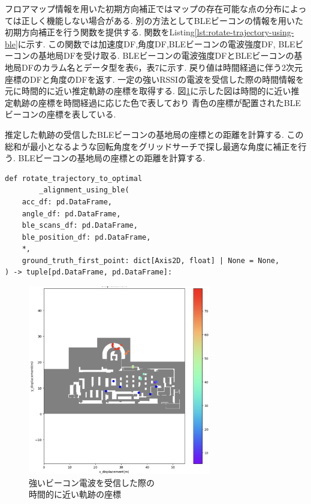 フロアマップ情報を用いた初期方向補正ではマップの存在可能な点の分布によっては正しく機能しない場合がある.
別の方法としてBLEビーコンの情報を用いた初期方向補正を行う関数を提供する.
関数をListing\ref{lst:rotate-trajectory-using-ble}に示す.
この関数では加速度DF,角度DF,BLEビーコンの電波強度DF, BLEビーコンの基地局DFを受け取る.
BLEビーコンの電波強度DFとBLEビーコンの基地局DFのカラム名とデータ型を表6，表7に示す.
戻り値は時間経過に伴う2次元座標のDFと角度のDFを返す.
一定の強いRSSIの電波を受信した際の時間情報を元に時間的に近い推定軌跡の座標を取得する.
図\ref{fig:ble-merge}に示した図は時間的に近い推定軌跡の座標を時間経過に応じた色で表しており
青色の座標が配置されたBLEビーコンの座標を表している.

推定した軌跡の受信したBLEビーコンの基地局の座標との距離を計算する.
この総和が最小となるような回転角度をグリッドサーチで探し最適な角度に補正を行う.
BLEビーコンの基地局の座標との距離を計算する.

\begin{lstlisting}[caption={BLEを使用した初期方向補正}, label=lst:rotate-trajectory-using-ble]
def rotate_trajectory_to_optimal
		_alignment_using_ble(
    acc_df: pd.DataFrame,
    angle_df: pd.DataFrame,
    ble_scans_df: pd.DataFrame,
    ble_position_df: pd.DataFrame,
    *,
    ground_truth_first_point: dict[Axis2D, float] | None = None,
) -> tuple[pd.DataFrame, pd.DataFrame]:
\end{lstlisting}

\begin{figure}[h]
	\centering
	\includegraphics[width=80mm]{image/ble-merge.jpg}
	\caption{強いビーコン電波を受信した際の\\時間的に近い軌跡の座標}    \label{fig:ble-merge}
\end{figure}

